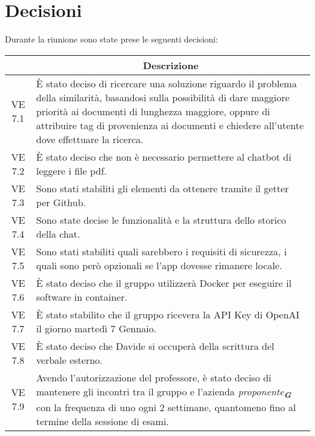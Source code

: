 

\section{Decisioni}

Durante la riunione sono state prese le seguenti decisioni:

\vspace{0.5cm}

\begin{table}[htbp]
    \centering
    \begin{tabular}{|c|p{}|}
        \hline
        \rowcolor[gray]{0.75}
        \multicolumn{1}{|c|}{\textbf{Codice}} & \multicolumn{1}{|c|}{\textbf{Descrizione}}\\
        \hline
        VE 7.1 & È stato deciso di ricercare una soluzione riguardo il problema della similarità, basandosi sulla possibilità di dare maggiore priorità ai documenti di lunghezza maggiore, oppure di attribuire tag di provenienza ai documenti e chiedere all'utente dove effettuare la ricerca. \\
        VE 7.2 & È stato deciso che non è necessario permettere al chatbot di leggere i file pdf. \\
        VE 7.3 & Sono stati stabiliti gli elementi da ottenere tramite il getter per Github. \\
        VE 7.4 & Sono state decise le funzionalità e la struttura dello storico della chat. \\
        VE 7.5 & Sono stati stabiliti quali sarebbero i requisiti di sicurezza, i quali sono però opzionali se l'app dovesse rimanere locale. \\
        VE 7.6 & È stato deciso che il gruppo utilizzerà Docker per eseguire il software in container. \\
        VE 7.7 & È stato stabilito che il gruppo ricevera la API Key di OpenAI il giorno martedì 7 Gennaio. \\
        VE 7.8 & È stato deciso che Davide si occuperà della scrittura del verbale esterno. \\
        VE 7.9 & Avendo l'autorizzazione del professore, è stato deciso di mantenere gli incontri tra il gruppo e l'azienda \emph{proponente}\textsubscript{\textbf{\textit{G}}} con la frequenza di uno ogni 2 settimane, quantomeno fino al termine della sessione di esami. \\
        \hline
    \end{tabular}
\end{table}